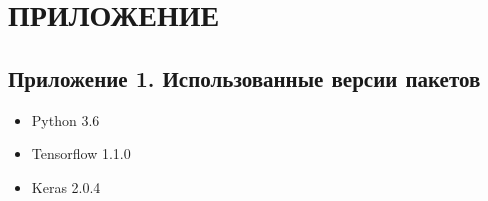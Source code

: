 \clearpage
\section*{\hfil ПРИЛОЖЕНИЕ \hfil}
	\subsection*{Приложение 1. Использованные версии пакетов}
		\begin{itemize}
			\item Python 3.6
			\item Tensorflow 1.1.0
			\item Keras 2.0.4
		\end{itemize}